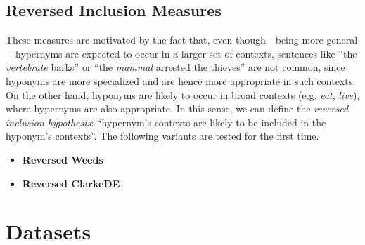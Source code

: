 \documentclass[11pt]{article}
\begin{document}
\subsection{Reversed Inclusion Measures}
\label{sec:rev_inclusion_measures}

These measures are motivated by the fact that, even though---being more general---hypernyms are expected to occur in a larger set of contexts, sentences like ``the \emph{vertebrate} barks'' or ``the \emph{mammal} arrested the thieves'' are not common, since hyponyms are more specialized and are hence more appropriate in such contexts. On the other hand, hyponyms are likely to occur in broad contexts (e.g. \emph{eat}, \emph{live}), where hypernyms are also appropriate. In this sense, we can define the \emph{reversed inclusion hypothesis}: ``hypernym's contexts are likely to be included in the hyponym's contexts''. The following variants are tested for the first time.

\begin{itemize}[leftmargin=*]

\item \textbf{Reversed Weeds} 


\item \textbf{Reversed ClarkeDE} 

	
\end{itemize}



\section{Datasets}
\label{sec:datasets}
\end{document}
